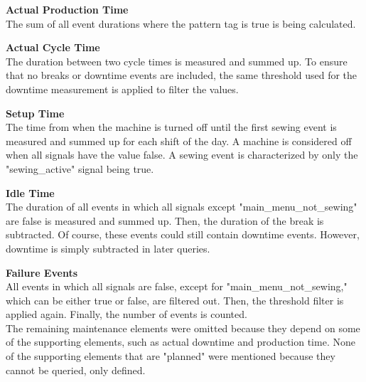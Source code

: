 \textbf{Actual Production Time}\\
The sum of all event durations where the pattern tag is true is being calculated.

\textbf{Actual Cycle Time}\\
The duration between two cycle times is measured and summed up. To ensure that no breaks or downtime events are included, the same threshold used for the downtime measurement is applied to filter the values.

\textbf{Setup Time}\\
The time from when the machine is turned off until the first sewing event is measured and summed up for each shift of the day. A machine is considered off when all signals have the value false. A sewing event is characterized by only the "sewing\_active" signal being true.

\textbf{Idle Time}\\
The duration of all events in which all signals except "main\_menu\_not\_sewing" are false is measured and summed up. Then, the duration of the break is subtracted. Of course, these events could still contain downtime events. However, downtime is simply subtracted in later queries.

\textbf{Failure Events}\\
All events in which all signals are false, except for "main\_menu\_not\_sewing," which can be either true or false, are filtered out. Then, the threshold filter is applied again. Finally, the number of events is counted.\\

The remaining maintenance elements were omitted because they depend on some of the supporting elements, such as actual downtime and production time. None of the supporting elements that are "planned" were mentioned because they cannot be queried, only defined.



